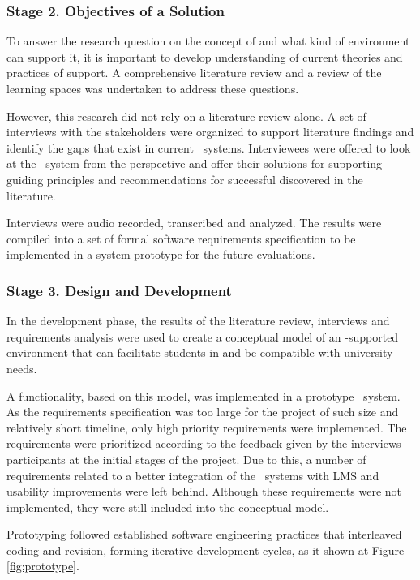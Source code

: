\subsubsection{Stage 2. Objectives of a Solution}

To answer the research question on the concept of \LLLs and what kind of
environment can support it, it is important to develop understanding of
current theories and practices of \LLLs support. A comprehensive literature
review and a review of the learning spaces was undertaken to address these
questions.

However, this research did not rely on a literature review alone. A set of
interviews with the stakeholders were organized to support literature findings
and identify the gaps that exist in current \ep~systems. Interviewees were
offered to look at the \ep~system from the \LLLs perspective and offer their
solutions for supporting guiding principles and recommendations for successful
\LLLs discovered in the literature.

Interviews were audio recorded, transcribed and analyzed. The results were
compiled into a set of formal software requirements specification to be
implemented in a system prototype for the future evaluations.

\subsubsection{Stage 3. Design and Development}

In the development phase, the results of the literature review, interviews and
requirements analysis were used to create a conceptual model of an \ep-supported
environment that can facilitate students in \LLLs and be compatible with
university needs.

A functionality, based on this model, was implemented in a prototype \ep~system.
As the requirements specification was too large for the project of such size and
relatively short timeline, only high priority requirements were implemented. The
requirements were prioritized according to the feedback given by the interviews
participants at the initial stages of the project. Due to this, a number of
requirements related to a better integration of the \ep~systems with LMS and
usability improvements were left behind. Although these requirements were not
implemented, they were still included into the conceptual model.

Prototyping followed established software engineering practices that interleaved
coding and revision, forming iterative development cycles, as it shown at Figure
\ref{fig:prototype}.

